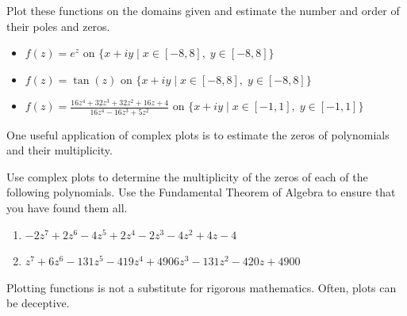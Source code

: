 \begin{problem}\label{prob:findpz}
Plot these functions on the domains given and estimate the number and order of their poles and zeros.
\begin{itemize}
\item $f(z) = e^z$ on $\{ x+iy \mid x \in [-8,8], \; y \in [-8,8]\}$
\item $f(z) = \tan(z)$ on $\{x+iy \mid x \in [-8,8], \; y \in [-8,8]\}$
\item $f(z) = \frac{16z^4+32z^3+32z^2+16z+4}{16z^4-16z^3+5z^2}$ on $\{x+iy \mid x \in [-1,1], \; y \in [-1,1]\}$
\end{itemize}
\end{problem}

One useful application of complex plots is to estimate the zeros of polynomials and their multiplicity.

\begin{problem}\label{prob:find_roots}
Use complex plots to determine the multiplicity of the zeros of each of the following polynomials.
Use the Fundamental Theorem of Algebra to ensure that you have found them all.
\begin{enumerate}
\item $-2z^7+2z^6-4z^5+2z^4-2z^3-4z^2+4z-4$
\item $z^7 + 6z^6 - 131z^5 - 419z^4 + 4906z^3 - 131z^2 - 420z + 4900$
\end{enumerate}
\end{problem}

Plotting functions is not a substitute for rigorous mathematics. 
Often, plots can be deceptive.

